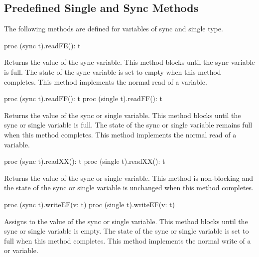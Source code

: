 \subsection{Predefined Single and Sync Methods}
\label{Functions_on_Synchronization_Variables}

The following methods are defined for variables of sync and single
type.

\begin{protohead}
proc (sync t).readFE(): t
\end{protohead}
\begin{protobody}
Returns the value of the sync variable.  This method blocks until the
sync variable is full.  The state of the sync variable is set to empty
when this method completes.
This method implements the normal read of a  variable.
\end{protobody}

\begin{protohead}
proc (sync t).readFF(): t
proc (single t).readFF(): t
\end{protohead}
\begin{protobody}
Returns the value of the sync or single variable.  This method blocks
until the sync or single variable is full.  The state of the sync or
single variable remains full when this method completes.
This method implements the normal read of a  variable.
\end{protobody}

\begin{protohead}
proc (sync t).readXX(): t
proc (single t).readXX(): t
\end{protohead}
\begin{protobody}
Returns the value of the sync or single variable.  This method is non-blocking
and the state of the sync or single variable is unchanged when this method
completes.
\end{protobody}

\begin{protohead}
proc (sync t).writeEF(v: t)
proc (single t).writeEF(v: t)
\end{protohead}
\begin{protobody}
Assigns  to the value of the sync or single variable.  This
method blocks until the sync or single variable is empty.  The state
of the sync or single variable is set to full when this method
completes.
This method implements the normal write of a  or 
variable.
\end{protobody}

